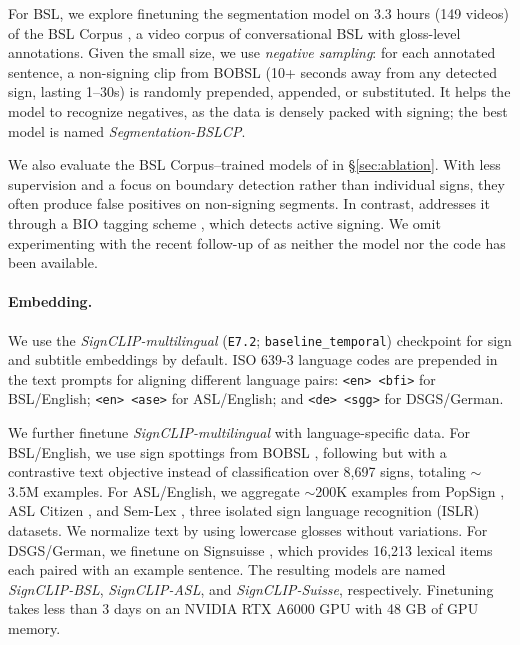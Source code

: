 \documentclass[11pt]{article}
\begin{document}
For BSL, we explore finetuning the segmentation model on 3.3 hours (149 videos) of the BSL Corpus \cite{schembri2013building}, a video corpus of conversational BSL with gloss-level annotations. 
Given the small size, we use \textit{negative sampling}: for each annotated sentence, a non-signing clip from BOBSL (10+ seconds away from any detected sign, lasting 1–30s) is randomly prepended, appended, or substituted. 
It helps the model to recognize negatives, as the data is densely packed with signing; the best model is named \textit{Segmentation-BSLCP}.

We also evaluate the BSL Corpus–trained models of \citet{Renz2021signsegmentation_a,Renz2021signsegmentation_b} in \S\ref{sec:ablation}.
With less supervision and a focus on boundary detection rather than individual signs, they often produce false positives on non-signing segments.
In contrast, \citet{moryossef-etal-2023-linguistically} addresses it through a BIO tagging scheme \cite{ramshaw1999text}, which detects active signing.
We omit experimenting with the recent follow-up of \citet{he2025hands} as neither the model nor the code has been available.


\paragraph{Embedding.} We use the \textit{SignCLIP-multilingual} (\texttt{E7.2}; \texttt{baseline\_temporal}) checkpoint for sign and subtitle embeddings by default. 
ISO 639-3 language codes are prepended in the text prompts for aligning different language pairs: \texttt{<en> <bfi>} for BSL/English; \texttt{<en> <ase>} for ASL/English; and \texttt{<de> <sgg>} for DSGS/German.

We further finetune \textit{SignCLIP-multilingual} with language-specific data. 
For BSL/English, we use sign spottings from BOBSL \cite{Momeni22}, following \citet{raude2024tale,jang2025lost} but with a contrastive text objective instead of classification over 8,697 signs, totaling $\sim$3.5M examples. 
For ASL/English, we aggregate $\sim$200K examples from PopSign \cite{Starner2023PopSignAV}, ASL Citizen \cite{Desai2023ASLCA}, and Sem-Lex \cite{Kezar2023TheSB}, three isolated sign language recognition (ISLR) datasets. 
We normalize text by using lowercase glosses without variations. 
For DSGS/German, we finetune on Signsuisse \cite{muller-etal-2023-findings}, which provides 16,213 lexical items each paired with an example sentence. 
The resulting models are named \textit{SignCLIP-BSL}, \textit{SignCLIP-ASL}, and \textit{SignCLIP-Suisse}, respectively.
Finetuning takes less than 3 days on an NVIDIA RTX A6000 GPU with 48 GB of GPU memory.
\end{document}
